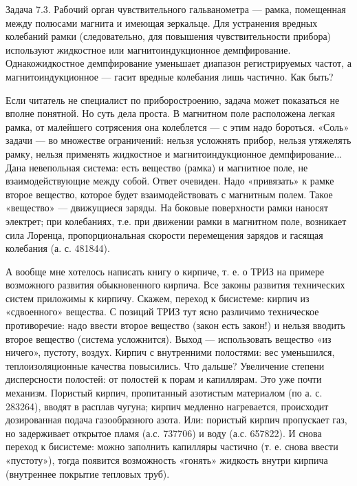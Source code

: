 Задача  7.3.  Рабочий  орган чувствительного  гальванометра  —  рамка,
помещенная между полюсами магнита  и имеющая зеркальце. Для устранения
вредных колебаний рамки (следовательно, для повышения чувствительности
прибора) используют жидкостное  или магнитоиндукционное демпфирование.
Однакожидкостное   демпфирование  уменьшает   диапазон  регистрируемых
частот, а магнитоиндукционное — гасит вредные колебания лишь частично.
Как быть?

Если  читатель   не  специалист   по  приборостроению,   задача  может
показаться не вполне  понятной. Но суть дела проста.  В магнитном поле
расположена  легкая рамка,  от малейшего  сотрясения она  колеблется —
с  этим  надо бороться.  «Соль»  задачи  — во  множестве  ограничений:
нельзя  усложнять прибор,  нельзя  утяжелять  рамку, нельзя  применять
жидкостное  и  магнитоиндукционное демпфирование...  Дана  невепольная
система: есть вещество (рамка)  и магнитное поле, не взаимодействующие
между собой. Ответ очевиден. Надо «привязать» к рамке второе вещество,
которое будет взаимодействовать с  магнитным полем. Такое «вещество» —
движущиеся заряды. На боковые  поверхности рамки наносят электрет; при
колебаниях, т.е. при  движении рамки в магнитном  поле, возникает сила
Лоренца,  пропорциональная  скорости  перемещения  зарядов  и  гасящая
колебания (а. с. 481844).


А  вообще мне  хотелось написать  книгу  о кирпиче,  т. е.  о ТРИЗ  на
примере возможного развития обыкновенного кирпича. Все законы развития
технических систем  приложимы к кирпичу. Скажем,  переход к бисистеме:
кирпич из  «сдвоенного» вещества.  С позиций  ТРИЗ тут  ясно различимо
техническое  противоречие: надо  ввести  второе  вещество (закон  есть
закон!) и  нельзя вводить второе вещество  (система усложнится). Выход
—  использовать  вещество  «из  ничего»,  пустоту,  воздух.  Кирпич  с
внутренними  полостями:  вес  уменьшился,  теплоизоляционные  качества
повысились. Что  дальше? Увеличение степени дисперсности  полостей: от
полостей  к  порам и  капиллярам.  Это  уже почти  механизм.  Пористый
кирпич, пропитанный азотистым  материалом (по а. с.  283264), вводят в
расплав чугуна;  кирпич медленно нагревается,  происходит дозированная
подача газообразного  азота. Или:  пористый кирпич пропускает  газ, но
задерживает открытое пламя (а.с. 737706) и воду (а.с. 657822). И снова
переход к бисистеме:  можно заполнить капилляры частично  (т. е. снова
ввести «пустоту»), тогда появится возможность «гонять» жидкость внутри
кирпича (внутреннее покрытие тепловых труб).

